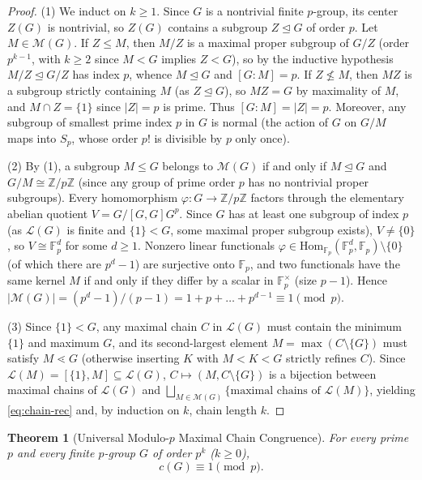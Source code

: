 \documentclass[11pt,a4paper]{article}
\newtheorem{theorem}{Theorem}[section]
\theoremstyle{definition}
\newcommand{\Hom}{\mathrm{Hom}}
\newcommand{\Fp}{\mathbb{F}_p}
\begin{document}
\begin{proof}
(1) We induct on $k \ge 1$. Since $G$ is a nontrivial finite $p$-group, its center $Z(G)$ is nontrivial, so $Z(G)$ contains a subgroup $Z \trianglelefteq G$ of order $p$. Let $M \in \mathcal{M}(G)$. If $Z \le M$, then $M/Z$ is a maximal proper subgroup of $G/Z$ (order $p^{k-1}$, with $k \ge 2$ since $M < G$ implies $Z < G$), so by the inductive hypothesis $M/Z \trianglelefteq G/Z$ has index $p$, whence $M \trianglelefteq G$ and $[G:M] = p$. If $Z \not\le M$, then $MZ$ is a subgroup strictly containing $M$ (as $Z \trianglelefteq G$), so $MZ = G$ by maximality of $M$, and $M \cap Z = \{1\}$ since $|Z| = p$ is prime. Thus $[G : M] = |Z| = p$. Moreover, any subgroup of smallest prime index $p$ in $G$ is normal (the action of $G$ on $G/M$ maps into $S_p$, whose order $p!$ is divisible by $p$ only once).

(2) By (1), a subgroup $M \le G$ belongs to $\mathcal{M}(G)$ if and only if $M \trianglelefteq G$ and $G/M \cong \mathbb{Z}/p\mathbb{Z}$ (since any group of prime order $p$ has no nontrivial proper subgroups). Every homomorphism $\varphi : G \to \mathbb{Z}/p\mathbb{Z}$ factors through the elementary abelian quotient $V = G/[G,G]G^p$. Since $G$ has at least one subgroup of index $p$ (as $\mathcal{L}(G)$ is finite and $\{1\} < G$, some maximal proper subgroup exists), $V \ne \{0\}$, so $V \cong \Fp^d$ for some $d \ge 1$. Nonzero linear functionals $\varphi \in \Hom_{\Fp}(\Fp^d, \Fp) \setminus \{0\}$ (of which there are $p^d - 1$) are surjective onto $\Fp$, and two functionals have the same kernel $M$ if and only if they differ by a scalar in $\Fp^\times$ (size $p - 1$). Hence $|\mathcal{M}(G)| = (p^d - 1)/(p - 1) = 1 + p + \dots + p^{d-1} \equiv 1 \pmod p$.

(3) Since $\{1\} < G$, any maximal chain $C$ in $\mathcal{L}(G)$ must contain the minimum $\{1\}$ and maximum $G$, and its second-largest element $M = \max(C \setminus \{G\})$ must satisfy $M \lessdot G$ (otherwise inserting $K$ with $M < K < G$ strictly refines $C$). Since $\mathcal{L}(M) = [\{1\}, M] \subseteq \mathcal{L}(G)$, $C \mapsto (M, C \setminus \{G\})$ is a bijection between maximal chains of $\mathcal{L}(G)$ and $\bigsqcup_{M \in \mathcal{M}(G)} \{\text{maximal chains of } \mathcal{L}(M)\}$, yielding \eqref{eq:chain-rec} and, by induction on $k$, chain length $k$.
\end{proof}

\begin{theorem}[Universal Modulo-$p$ Maximal Chain Congruence]\label{thm:mod-p}
For every prime $p$ and every finite $p$-group $G$ of order $p^k$ ($k \ge 0$),
\[
  c(G) \equiv 1 \pmod p.
\]
\end{theorem}
\end{document}
